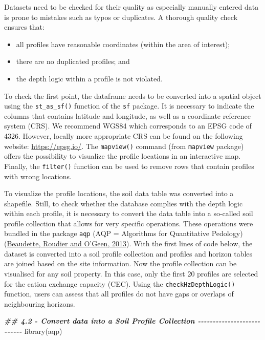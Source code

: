 \documentclass[
  10pt,
  b5paper,
  oneside]{book}
\newenvironment{Shaded}{\begin{snugshade}}{\end{snugshade}}
\newcommand{\DocumentationTok}[1]{\textcolor[rgb]{0.56,0.35,0.01}{\textbf{\textit{#1}}}}
\newcommand{\FunctionTok}[1]{\textcolor[rgb]{0.00,0.00,0.00}{#1}}
\newcommand{\NormalTok}[1]{#1}
\providecommand{\tightlist}{%
  \setlength{\itemsep}{0pt}\setlength{\parskip}{0pt}}
\begin{document}
Datasets need to be checked for their quality as especially manually entered data is prone to mistakes such as typos or duplicates. A thorough quality check ensures that:

\begin{itemize}
\tightlist
\item
  all profiles have reasonable coordinates (within the area of interest);
\item
  there are no duplicated profiles; and
\item
  the depth logic within a profile is not violated.
\end{itemize}

To check the first point, the dataframe needs to be converted into a spatial object using the \texttt{st\_as\_sf()} function of the \texttt{sf} package. It is necessary to indicate the columns that contains latitude and longitude, as well as a coordinate reference system (CRS). We recommend WGS84 which corresponds to an EPSG code of 4326. However, locally more appropriate CRS can be found on the following website: \url{https://epsg.io/}. The \texttt{mapview()} command (from \texttt{mapview} package) offers the possibility to visualize the profile locations in an interactive map. Finally, the \texttt{filter()} function can be used to remove rows that contain profiles with wrong locations.

To visualize the profile locations, the soil data table was converted into a shapefile. Still, to check whether the database complies with the depth logic within each profile, it is necessary to convert the data table into a so-called soil profile collection that allows for very specific operations. These operations were bundled in the package \texttt{aqp} (AQP = Algorithms for Quantitative Pedology) (\protect\hyperlink{ref-beaudette2013}{Beaudette, Roudier and O'Geen, 2013}).
With the first lines of code below, the dataset is converted into a soil profile collection and profiles and horizon tables are joined based on the site information.
Now the profile collection can be visualised for any soil property. In this case, only the first 20 profiles are selected for the cation exchange capacity (CEC).
Using the \texttt{checkHzDepthLogic()} function, users can assess that all profiles do not have gaps or overlaps of neighbouring horizons.

\begin{Shaded}
\begin{Highlighting}[]
\DocumentationTok{\#\# 4.2 {-} Convert data into a Soil Profile Collection {-}{-}{-}{-}{-}{-}{-}{-}{-}{-}{-}{-}{-}{-}{-}{-}{-}{-}{-}{-}{-}{-}{-}{-}{-}{-}{-}}
\FunctionTok{library}\NormalTok{(aqp)}
\end{Highlighting}
\end{Shaded}
\end{document}
